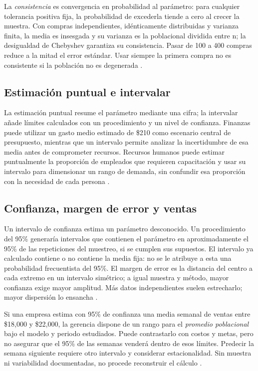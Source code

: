 {\clearpage
La \textit{consistencia} es convergencia en probabilidad al parámetro: para cualquier tolerancia positiva fija, la probabilidad de excederla tiende a cero al crecer la muestra. Con compras independientes, idénticamente distribuidas y varianza finita, la media es insesgada y su varianza es la poblacional dividida entre n; la desigualdad de Chebyshev garantiza su consistencia. Pasar de 100 a 400 compras reduce a la mitad el error estándar. Usar siempre la primera compra no es consistente si la población no es degenerada \citep[sec. 9.3]{wackerly2010}.

\subsection{Estimación puntual e intervalar}
La estimación puntual resume el parámetro mediante una cifra; la intervalar añade límites calculados con un procedimiento y un nivel de confianza. Finanzas puede utilizar un gasto medio estimado de \$210 como escenario central de presupuesto, mientras que un intervalo permite analizar la incertidumbre de esa media antes de comprometer recursos. Recursos humanos puede estimar puntualmente la proporción de empleados que requieren capacitación y usar su intervalo para dimensionar un rango de demanda, sin confundir esa proporción con la necesidad de cada persona \citep{holmesBusiness2023}.

\subsection{Confianza, margen de error y ventas}
Un intervalo de confianza estima un parámetro desconocido. Un procedimiento del 95\% generaría intervalos que contienen el parámetro en aproximadamente el 95\% de las repeticiones del muestreo, si se cumplen sus supuestos. El intervalo ya calculado contiene o no contiene la media fija: no se le atribuye a esta una probabilidad frecuentista del 95\%. El margen de error es la distancia del centro a cada extremo en un intervalo simétrico; a igual muestra y método, mayor confianza exige mayor amplitud. Más datos independientes suelen estrecharlo; mayor dispersión lo ensancha \citep{nistHandbook}.

Si una empresa estima con 95\% de confianza una media semanal de ventas entre \$18,000 y \$22,000, la gerencia dispone de un rango para el \textit{promedio poblacional} bajo el modelo y periodo estudiados. Puede contrastarlo con costos y metas, pero no asegurar que el 95\% de las semanas venderá dentro de esos límites. Predecir la semana siguiente requiere otro intervalo y considerar estacionalidad. Sin muestra ni variabilidad documentadas, no procede reconstruir el cálculo \citep{nistHandbook}.

}
